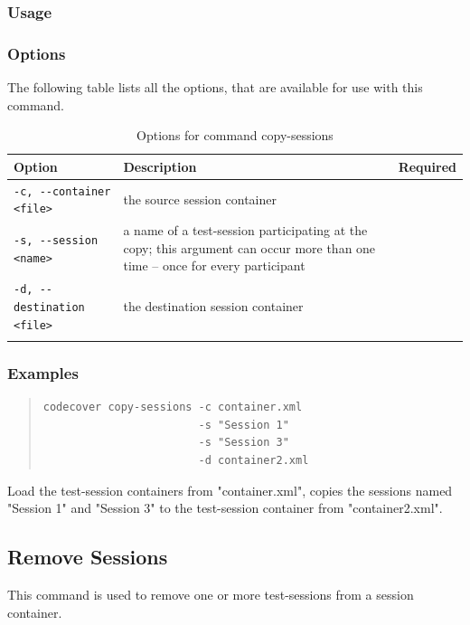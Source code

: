 \subsubsection{Usage}\label{command:cs:usage}
\begin{quote}
\end{quote}

\subsubsection{Options}\label{command:cs:options}
The following table lists all the options, that are available for use with this command.
\begin{longtable}{|l|p{4cm}|c|}\hline
   {\textbf{Option}} & 
   {\textbf{Description}} & 
   {\textbf{Required}} \\\hline \hline \endhead
   \verb$-c, --container <file>$ & the source session container & \x \\\hline
   \verb$-s, --session <name>$ & a name of a test-session participating at the copy; this argument can occur more than one time -- once for every participant & \x \\\hline
   \verb$-d, --destination <file>$ & the destination session container & \x \\\hline
  \caption{Options for command copy-sessions}
  \label{fr_tb:Options for command copy-sessions}
\end{longtable}

\subsubsection{Examples}\label{command:cs:examples}
\begin{quote}
\begin{verbatim}
codecover copy-sessions -c container.xml 
                        -s "Session 1" 
                        -s "Session 3" 
                        -d container2.xml
\end{verbatim}
\end{quote}
Load the test-session containers from "container.xml", copies the sessions named "Session 1" and "Session 3" to the test-session container from "container2.xml".
\subsection{Remove Sessions}\label{Command-Remove-Sessions}
This command is used to remove one or more test-sessions from a session container.
